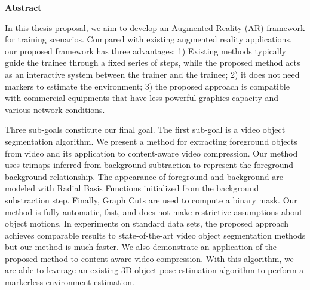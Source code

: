 
\begin{center}\textbf{Abstract}\end{center}

In this thesis proposal, we aim to develop an Augmented Reality (AR) framework for training scenarios.
Compared with existing augmented reality applications, our proposed framework has three advantages: 1) Existing methods typically guide the trainee through a fixed series of steps, while the proposed method acts as an interactive system between the trainer and the trainee; 2) it does not need markers to estimate the environment; 3) the proposed approach is compatible with commercial equipments that have less powerful graphics capacity and various network conditions.

Three sub-goals constitute our final goal.
The first sub-goal is a video object segmentation algorithm.
We present a method for extracting foreground objects from video and its application to content-aware video compression. Our method uses trimaps inferred from background subtraction to represent the foreground-background relationship. The appearance of foreground and background are modeled with Radial Basis Functions initialized from the background substraction step. Finally, Graph Cuts are used to compute a binary mask. Our method is fully automatic, fast, and does not make restrictive assumptions about object motions. In experiments on standard data sets, the proposed approach achieves comparable results to state-of-the-art video object segmentation methods but our method is much faster. We also demonstrate an application of the proposed method to content-aware video compression.
With this algorithm, we are able to leverage an existing 3D object pose estimation algorithm to perform a markerless environment estimation.

